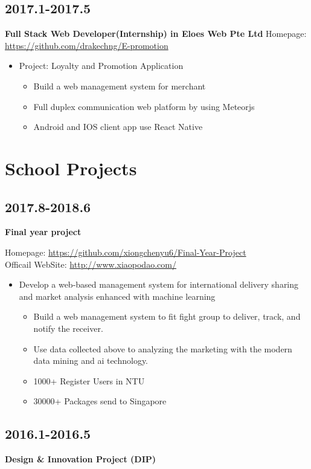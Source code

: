 \documentclass[11pt]{article}
\begin{document}
\subsection{2017.1-2017.5}
\label{sec:orgc8f50cf}
\textbf{Full Stack Web Developer(Internship) in Eloes Web Pte Ltd}
Homepage: \url{https://github.com/drakechng/E-promotion}
\begin{itemize}
\item Project: Loyalty and Promotion Application
\begin{itemize}
\item Build a web management system for merchant
\item Full duplex communication web platform by using Meteorjs
\item Android and IOS client app use React Native
\end{itemize}
\end{itemize}

\section{School Projects}
\label{sec:orga99b8a3}
\subsection{2017.8-2018.6}
\label{sec:org84a268e}
\textbf{Final year project}

Homepage: \url{https://github.com/xiongchenyu6/Final-Year-Project} \\
Officail WebSite: \url{http://www.xiaopodao.com/}

\begin{itemize}
\item Develop a web-based management system for international delivery sharing and market analysis enhanced with machine learning
\begin{itemize}
\item Build a web management system to fit fight group to deliver, track, and notify the receiver.
\item Use data collected above to analyzing the marketing with the modern data mining and ai technology.
\item 1000+ Register Users in NTU
\item 30000+ Packages send to Singapore
\end{itemize}
\end{itemize}
\subsection{2016.1-2016.5}
\label{sec:org56d9592}
\textbf{Design \& Innovation Project (DIP)}
\end{document}
